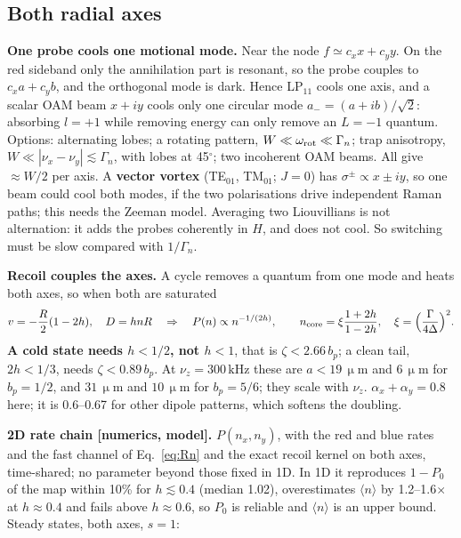 \documentclass[11pt,a4paper]{article}
\newcommand{\micrometre}{\upmu m}\newcommand{\microkelvin}{\upmu K}
\newcommand{\SI}[2]{\ensuremath{#1\,\mathrm{#2}}}
\begin{document}
\subsection{Both radial axes}
\label{sec:2d}\hypertarget{d:2d}{}
\textbf{One probe cools one motional mode.} Near the node $f\simeq c_xx+c_yy$. On the red sideband only the annihilation part is resonant, so the probe couples to $c_xa+c_yb$, and the orthogonal mode is dark. Hence LP$_{11}$ cools one axis, and a scalar OAM beam $x+iy$ cools only one circular mode $a_-=(a+ib)/\sqrt2$: absorbing $l=+1$ while removing energy can only remove an $L=-1$ quantum. Options: alternating lobes; a rotating pattern, $W\ll\omega_{\rm rot}\ll\Gamma_n$; trap anisotropy, $W\ll|\nu_x-\nu_y|\lesssim\Gamma_n$, with lobes at 45$^\circ$; two incoherent OAM beams. All give $\approx W/2$ per axis. A \textbf{vector vortex} (TE$_{01}$, TM$_{01}$; $J=0$) has $\sigma^\pm\propto x\pm iy$, so one beam could cool both modes, if the two polarisations drive independent Raman paths; this needs the Zeeman model. Averaging two Liouvillians is not alternation: it adds the probes coherently in $H$, and does not cool. So switching must be slow compared with $1/\Gamma_n$.

\textbf{Recoil couples the axes.} A cycle removes a quantum from one mode and heats both axes, so when both are saturated
\begin{equation}
  v=-\frac R2(1-2h),\quad D=hnR\quad\Rightarrow\quad P(n)\propto n^{-1/(2h)},\qquad n_{\rm core}=\xi\frac{1+2h}{1-2h},\quad\xi=\Big(\frac{\Gamma}{4\Delta}\Big)^2 .
\end{equation}
\textbf{A cold state needs $h<1/2$, not $h<1$}, that is $\zeta<2.66\,b_p$; a clean tail, $2h<1/3$, needs $\zeta<0.89\,b_p$. At $\nu_z=\SI{300}{kHz}$ these are $a<\SI{19}{\micrometre}$ and \SI{6}{\micrometre} for $b_p=1/2$, and \SI{31}{\micrometre} and \SI{10}{\micrometre} for $b_p=5/6$; they scale with $\nu_z$. $\alpha_x+\alpha_y=0.8$ here; it is 0.6--0.67 for other dipole patterns, which softens the doubling.

\textbf{2D rate chain [numerics, model].} $P(n_x,n_y)$, with the red and blue rates and the fast channel of Eq.~\eqref{eq:Rn} and the exact recoil kernel on both axes, time-shared; no parameter beyond those fixed in 1D. In 1D it reproduces $1-P_0$ of the map within 10\% for $h\lesssim0.4$ (median 1.02), overestimates $\langle n\rangle$ by 1.2--1.6$\times$ at $h\approx0.4$ and fails above $h\approx0.6$, so $P_0$ is reliable and $\langle n\rangle$ is an upper bound. Steady states, both axes, $s=1$:
\end{document}
